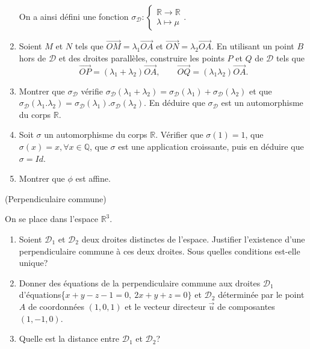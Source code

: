 \documentclass[a4paper,12pt,reqno]{amsart}
\begin{document}
\begin{exo}
\begin{enumerate}
    On a ainsi défini une fonction
      $
        \sigma_{\mathcal{D}} :
        \begin{cases}
          \mathbb{R}\rightarrow\mathbb{R}\\
          \lambda\mapsto\mu
        \end{cases}
      $.\vspace{1mm}

    \item Soient $M$ et $N$ tels que $\overrightarrow{OM}=\lambda_{1}\overrightarrow{OA}$ et $\overrightarrow{ON}=\lambda_{2}\overrightarrow{OA}$. En utilisant un point $B$ hors de $\mathcal{D}$ et des droites parallèles, construire les points $P$ et $Q$ de $\mathcal{D}$ tels que
      \[
        \overrightarrow{OP}=(\lambda_{1}+\lambda_{2})\overrightarrow{OA},\qquad
        \overrightarrow{OQ}=(\lambda_{1}\lambda_{2})\overrightarrow{OA}.
      \]

    \item Montrer que $\sigma_{\mathcal{D}}$ vérifie $\sigma_{\mathcal{D}}(\lambda_{1}+\lambda_{2})=\sigma_{\mathcal{D}}(\lambda_{1})+\sigma_{\mathcal{D}}(\lambda_{2})$ et que $\sigma_{\mathcal{D}}(\lambda_{1}.\lambda_{2})=\sigma_{\mathcal{D}}(\lambda_{1}).\sigma_{\mathcal{D}}(\lambda_{2})$. En déduire que $\sigma_{\mathcal{D}}$ est un automorphisme du corps $\mathbb{R}$.

    \item Soit $\sigma$ un automorphisme du corps $\mathbb{R}$. Vérifier que $\sigma(1)=1$, que $\sigma(x)=x, \forall x\in\mathbb{Q}$, que $\sigma$ est une application croissante, puis en déduire que $\sigma=Id$.

    \item Montrer que $\phi$ est affine.
  \end{enumerate}
\end{exo}


\begin{exo} (Perpendiculaire commune)

  On se place dans l'espace $\mathbb{R}^{3}$.
  \begin{enumerate}
    \item Soient $\mathcal{D}_{1}$ et $\mathcal{D}_{2}$ deux droites distinctes de l'espace. Justifier l'existence d'une perpendiculaire commune à ces deux droites. Sous quelles conditions est-elle unique?

    \item Donner des équations de la perpendiculaire commune aux droites $\mathcal{D}_{1}$ d'équations\newline \{$x+y-z-1=0,\ 2x+y+z=0\}$ et $\mathcal{D}_{2}$ déterminée par le point $A$ de coordonnées $(1,0,1)$ et le vecteur directeur $\overrightarrow{u}$ de composantes $(1,-1,0)$.

    \item Quelle est la distance entre $\mathcal{D}_{1}$ et $\mathcal{D}_{2}$?
  \end{enumerate}
\end{exo}
\end{document}
